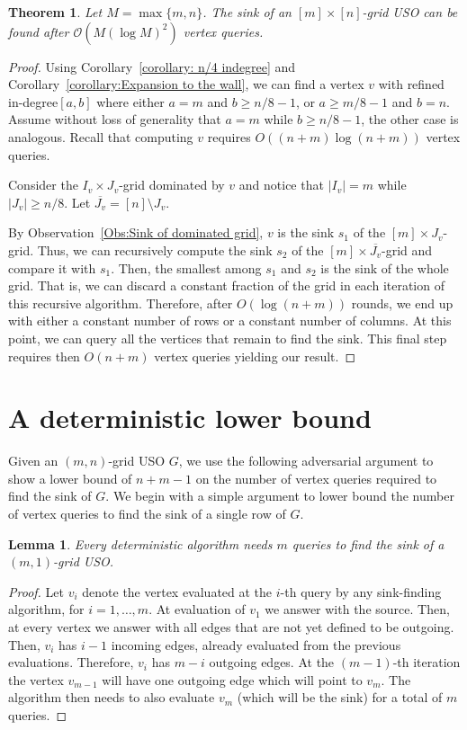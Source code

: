\documentclass[a4paper,10pt]{article}
\newtheorem{lemma}{Lemma}
\newtheorem{theorem}{Theorem}
\newcommand{\indegree}{refined in-degree\xspace}
\begin{document}
\begin{theorem}\label{theorem:Sink algorithm}
 Let $M = \max\{m,n\}$. The sink of an $[m]\times[n]$-grid USO can be found after $\mathcal{O}(M(\log M)^2)$ vertex queries.
\end{theorem}
\begin{proof}
Using  Corollary~\ref{corollary: n/4 indegree} and Corollary~\ref{corollary:Expansion to the wall}, we can find a vertex $v$ with \indegree $[a,b]$ where either $a = m$ and $b \geq  n/8-1$, or $a \geq  m/8-1$ and $b  = n$. Assume without loss of generality that $a = m$ while $b\geq  n/8-1$, the other case is analogous. Recall that computing $v$ requires $O((n + m) \log (n+m))$ vertex queries.

Consider the $I_v\times J_v$-grid dominated by $v$ and 
notice that $|I_v| = m$ while $|J_v| \geq n/8$. Let $\overline{J_v} = [n]\setminus J_v$.

By Observation~\ref{Obs:Sink of dominated grid}, $v$ is the sink $s_1$ of the $[m] \times J_v$-grid. Thus, we can recursively compute the sink $s_2$ of the $[m]\times \overline{J_v}$-grid and compare it with $s_1$. Then, the smallest among $s_1$ and $s_2$ is the sink of the whole grid.
That is, we can discard a constant fraction of the grid in each iteration of this recursive algorithm. Therefore, after $O(\log (n + m))$ rounds, we end up with either a constant number of rows or a constant number of columns. At this point, we can query all the vertices that remain to find the sink. This final step requires then $O(n + m)$ vertex queries yielding our result.
\end{proof}

 
\section{A deterministic lower bound}

Given an $(m, n)$-grid USO $G$, we use the following adversarial argument to show a lower bound of $n + m -1$ on the number of vertex queries required to find the sink of $G$.
We begin with a simple argument to lower bound the number of vertex queries to find the sink of a single row of $G$.

\begin{lemma}\label{lem:kx1}
Every deterministic algorithm needs $m$ queries to find the sink of a $(m,1)$-grid USO. 
\end{lemma}
\begin{proof}
Let $v_i$ denote the vertex evaluated at the $i$-th query by any sink-finding algorithm, for $i=1,\ldots, m$. At evaluation of $v_1$ we answer with the source. Then, at every vertex 
we answer with all edges that are not yet defined to be outgoing. Then, $v_i$ has $i-1$ incoming edges, already evaluated from the previous evaluations. 
Therefore, $v_i$ has $m-i$ outgoing edges. At the $(m-1)$-th iteration the vertex $v_{m-1}$ will have one outgoing edge which will point to $v_m$.
The algorithm then needs to also evaluate $v_m$ (which will be the sink) for a total of $m$ queries. 
\end{proof}
\end{document}
